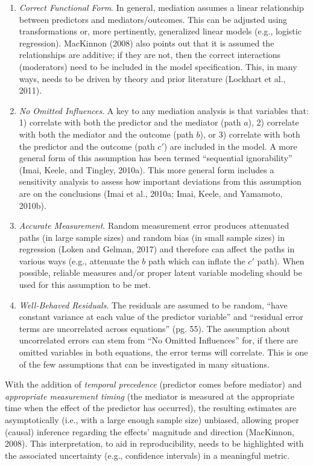 \documentclass[]{DissertateUSU}
\providecommand{\tightlist}{%
  \setlength{\itemsep}{0pt}\setlength{\parskip}{0pt}}
\begin{document}
\begin{enumerate}
\def\labelenumi{\arabic{enumi}.}
\tightlist
\item
  \emph{Correct Functional Form}. In general, mediation assumes a linear
  relationship between predictors and mediators/outcomes. This can be
  adjusted using transformations or, more pertinently, generalized
  linear models (e.g., logistic regression). MacKinnon (2008) also
  points out that it is assumed the relationships are additive; if they
  are not, then the correct interactions (moderators) need to be
  included in the model specification. This, in many ways, needs to be
  driven by theory and prior literature (Lockhart et al., 2011).
\item
  \emph{No Omitted Influences}. A key to any mediation analysis is that
  variables that: 1) correlate with both the predictor and the mediator
  (path \(a\)), 2) correlate with both the mediator and the outcome
  (path \(b\)), or 3) correlate with both the predictor and the outcome
  (path \(c'\)) are included in the model. A more general form of this
  assumption has been termed ``sequential ignorability'' (Imai, Keele,
  and Tingley, 2010a). This more general form includes a sensitivity
  analysis to assess how important deviations from this assumption are
  on the conclusions (Imai et al., 2010a; Imai, Keele, and Yamamoto,
  2010b).
\item
  \emph{Accurate Measurement}. Random measurement error produces
  attenuated paths (in large sample sizes) and random bias (in small
  sample sizes) in regression (Loken and Gelman, 2017) and therefore can
  affect the paths in various ways (e.g., attenuate the \(b\) path which
  can inflate the \(c'\) path). When possible, reliable measures and/or
  proper latent variable modeling should be used for this assumption to
  be met.
\item
  \emph{Well-Behaved Residuals}. The residuals are assumed to be random,
  ``have constant variance at each value of the predictor variable'' and
  ``residual error terms are uncorrelated across equations'' (pg. 55).
  The assumption about uncorrelated errors can stem from ``No Omitted
  Influences'' for, if there are omitted variables in both equations,
  the error terms will correlate. This is one of the few assumptions
  that can be investigated in many situations.
\end{enumerate}

With the addition of \emph{temporal precedence} (predictor comes before
mediator) and \emph{appropriate measurement timing} (the mediator is
measured at the appropriate time when the effect of the predictor has
occurred), the resulting estimates are asymptotically (i.e., with a
large enough sample size) unbiased, allowing proper (causal) inference
regarding the effects' magnitude and direction (MacKinnon, 2008). This
interpretation, to aid in reproducibility, needs to be highlighted with
the associated uncertainty (e.g., confidence intervals) in a meaningful
metric.
\end{document}
